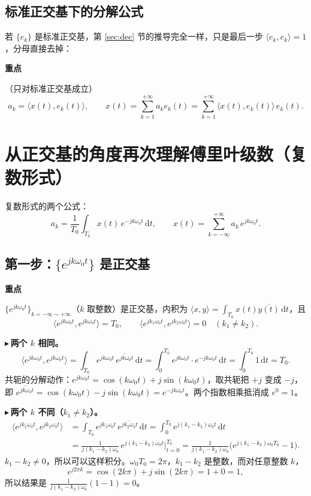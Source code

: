 \documentclass[UTF8,a4paper,11pt]{ctexart}
\newenvironment{remember}{\begin{rememberbox}\textbf{重点}\par\smallskip}{\end{rememberbox}}
\newcounter{ex}[section]
\newcommand{\point}[1]{\par\addvspace{1ex}\noindent\textcolor{ptteal}{$\blacktriangleright$\,\textbf{#1}}\ }
\begin{document}
\subsection{标准正交基下的分解公式}
若 $\{e_k\}$ 是标准正交基，第 \ref{sec:dec} 节的推导完全一样，只是最后一步 $\langle e_k,e_k\rangle=1$，分母直接去掉：
\begin{remember}
（只对标准正交基成立）
\[
a_k=\langle x(t),e_k(t)\rangle,\qquad
x(t)=\sum_{k=1}^{+\infty}a_ke_k(t)=\sum_{k=1}^{+\infty}\langle x(t),e_k(t)\rangle\,e_k(t).
\]
\end{remember}

\section{从正交基的角度再次理解傅里叶级数（复数形式）}\label{sec:fs}
复数形式的两个公式：
\[
a_k=\frac1{T_0}\int_{T_0}x(t)\,e^{-jk\omega_0t}\,\mathrm{d}t,\qquad
x(t)=\sum_{k=-\infty}^{+\infty}a_k\,e^{jk\omega_0t}.
\]

\subsection{第一步：\texorpdfstring{$\{e^{jk\omega_0t}\}$}{exp(jkω0t)} 是正交基}
\begin{remember}
$\{e^{jk\omega_0t}\}_{k=-\infty\sim+\infty}$（$k$ 取整数）是正交基，内积为 $\langle x,y\rangle=\int_{T_0}x(t)\overline{y(t)}\,\mathrm{d}t$，且
\[
\langle e^{jk\omega_0t},e^{jk\omega_0t}\rangle=T_0,\qquad
\langle e^{jk_1\omega_0t},e^{jk_2\omega_0t}\rangle=0\quad(k_1\ne k_2).
\]
\end{remember}

\point{两个 $k$ 相同。}
\[
\langle e^{jk\omega_0t},e^{jk\omega_0t}\rangle=\int_{T_0}e^{jk\omega_0t}\,\overline{e^{jk\omega_0t}}\,\mathrm{d}t
=\int_0^{T_0}e^{jk\omega_0t}\cdot e^{-jk\omega_0t}\,\mathrm{d}t=\int_0^{T_0}1\,\mathrm{d}t=T_0 .
\]
共轭的分解动作：$e^{jk\omega_0t}=\cos(k\omega_0t)+j\sin(k\omega_0t)$，取共轭把 $+j$ 变成 $-j$，即 $\overline{e^{jk\omega_0t}}=\cos(k\omega_0t)-j\sin(k\omega_0t)=e^{-jk\omega_0t}$。两个指数相乘抵消成 $e^0=1$。

\point{两个 $k$ 不同（$k_1\ne k_2$）。}
\begin{align*}
\langle e^{jk_1\omega_0t},e^{jk_2\omega_0t}\rangle
&=\int_{T_0}e^{jk_1\omega_0t}\,\overline{e^{jk_2\omega_0t}}\,\mathrm{d}t
=\int_0^{T_0}e^{j(k_1-k_2)\omega_0t}\,\mathrm{d}t\\
&=\frac{1}{j(k_1-k_2)\omega_0}\,e^{j(k_1-k_2)\omega_0t}\Big|_{t=0}^{T_0}
=\frac{1}{j(k_1-k_2)\omega_0}\Big(e^{j(k_1-k_2)\omega_0T_0}-1\Big).
\end{align*}
$k_1-k_2\ne0$，所以可以这样积分。$\omega_0T_0=2\pi$，$k_1-k_2$ 是整数，而对任意整数 $k$，
\[
e^{j2\pi k}=\cos(2k\pi)+j\sin(2k\pi)=1+0=1,
\]
所以结果是 $\frac{1}{j(k_1-k_2)\omega_0}(1-1)=0$。
\end{document}
